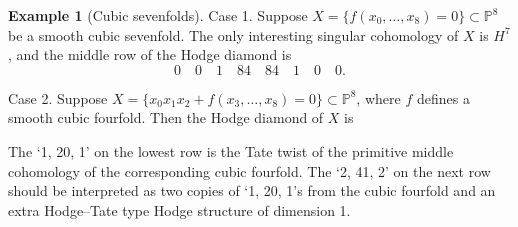 \documentclass[letterpaper,11pt]{amsart}
\theoremstyle{plain}
\theoremstyle{definition}
\newtheorem{exam}[theo]{Example}
\theoremstyle{remark}
\newcommand{\PP}{\mathbb{P}}
\begin{document}
\begin{exam}[Cubic sevenfolds]
        Case 1. Suppose $X = \{ f(x_{0},\ldots, x_{8}) = 0\} \subset \PP^{8}$ be a smooth cubic sevenfold. The only interesting singular cohomology of $X$ is $H^{7}$, and the middle row of the Hodge diamond is
        $$ 0 \quad 0 \quad 1 \quad 84 \quad 84 \quad 1 \quad 0 \quad 0.$$

        Case 2. Suppose $X = \{ x_{0}x_{1}x_{2} + f(x_{3},\ldots, x_{8}) = 0\} \subset \PP^{8}$, where $f$ defines a smooth cubic fourfold. Then the Hodge diamond of $X$ is
        \begin{center}
\end{center}
The `1, 20, 1' on the lowest row is the Tate twist of the primitive middle cohomology of the corresponding cubic fourfold. The `2, 41, 2' on the next row should be interpreted as two copies of `1, 20, 1's from the cubic fourfold and an extra Hodge--Tate type Hodge structure of dimension 1.


\end{exam}
\end{document}

